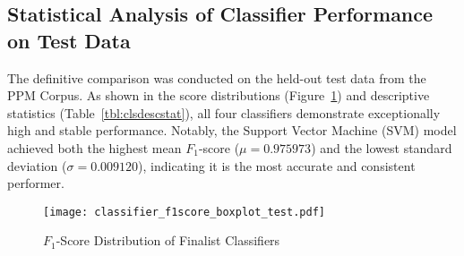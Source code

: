 \subsection{Statistical Analysis of Classifier Performance on Test Data}\label{ch:4.5.3}
The definitive comparison was conducted on the held-out test data from the PPM Corpus. As shown in the score distributions (Figure~\ref{fig:clscoredist}) and descriptive statistics (Table~\ref{tbl:clsdescstat}), all four classifiers demonstrate exceptionally high and stable performance. Notably, the Support Vector Machine (SVM) model achieved both the highest mean \(F_1\)-score (\(\mu = 0.975973\)) and the lowest standard deviation (\(\sigma = 0.009120\)), indicating it is the most accurate and consistent performer.
\begin{table}[tb]
    \captionsetup{skip=5pt}
    \caption{Classifier Descriptive Statistics}
    \label{tbl:clsdescstat}
    \centering
\end{table}
\begin{figure}[tb]
    \captionsetup{skip=5pt}
    \centering
    \texttt{[image: classifier\_f1score\_boxplot\_test.pdf]}
    \caption{\(F_1\)-Score Distribution of Finalist Classifiers}
    \label{fig:clscoredist}
\end{figure}

